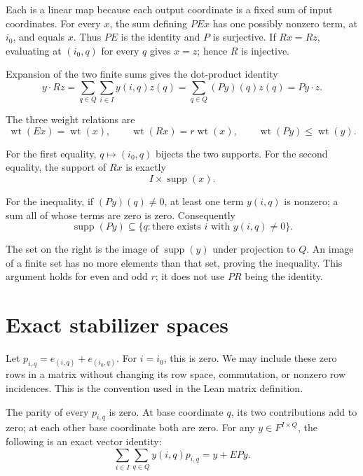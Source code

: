 \documentclass{article}
\DeclareMathOperator{\wt}{wt}
\DeclareMathOperator{\supp}{supp}
\begin{document}
Each is a linear map because each output coordinate is a fixed sum of
input coordinates. For every \(x\), the sum defining \(PEx\) has one
possibly nonzero term, at \(i_0\), and equals \(x\). Thus \(PE\) is the
identity and \(P\) is surjective. If \(Rx=Rz\), evaluating at \((i_0,q)\)
for every \(q\) gives \(x=z\); hence \(R\) is injective.

Expansion of the two finite sums gives the dot-product identity
\begin{equation}\label{eq:adjoint}
y\cdot Rz
=\sum_{q\in Q}\sum_{i\in I}y(i,q)z(q)
=\sum_{q\in Q}(Py)(q)z(q)
=Py\cdot z.
\end{equation}

The three weight relations are
\begin{equation}\label{eq:weights}
\wt(Ex)=\wt(x),\qquad
\wt(Rx)=r\wt(x),\qquad
\wt(Py)\le\wt(y).
\end{equation}

For the first equality, \(q\mapsto(i_0,q)\) bijects the two supports.
For the second equality, the support of \(Rx\) is exactly
\begin{equation}\label{eq:repeat-support}
I\times\supp(x).
\end{equation}

For the inequality, if \((Py)(q)\ne0\), at least one term \(y(i,q)\) is
nonzero; a sum all of whose terms are zero is zero. Consequently
\begin{equation}\label{eq:parity-support}
\supp(Py)
\subseteq\{q:\text{there exists }i\text{ with }y(i,q)\ne0\}.
\end{equation}

The set on the right is the image of \(\supp(y)\) under
projection to \(Q\). An image of a finite set has no more elements than
that set, proving the inequality. This argument holds for even and odd
\(r\); it does not use \(PR\) being the identity.

\section{Exact stabilizer spaces}\label{sec:stabilizers}

Let \(p_{i,q}=e_{(i,q)}+e_{(i_0,q)}\). For \(i=i_0\), this is zero. We may
include these zero rows in a matrix without changing its row space,
commutation, or nonzero row incidences. This is the convention used in
the Lean matrix definition.

The parity of every \(p_{i,q}\) is zero. At base coordinate \(q\), its two
contributions add to zero; at each other base coordinate both are zero.
For any \(y\in F^{I\times Q}\), the following is an exact vector identity:
\begin{equation}\label{eq:star-sum}
\sum_{i\in I}\sum_{q\in Q}y(i,q)p_{i,q}=y+EPy.
\end{equation}
\end{document}
